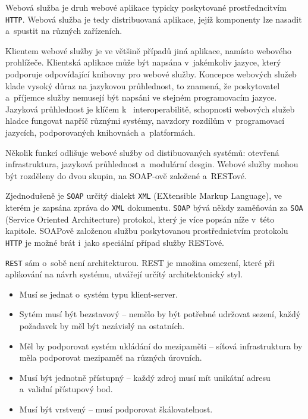 \documentclass[twoside, 12pt]{article}
\begin{document}
{

Webová služba je druh webové aplikace typicky poskytované prostředncitvím \texttt{HTTP}. \cite{kalin}
Webová služba je tedy distribuovaná aplikace, jejíž komponenty lze nasadit a~spustit na různých zařízeních.

Klientem webové služby je ve většině případů jiná aplikace, namísto webového prohlížeče.
Klientská aplikace může být napsána v~jakémkoliv jazyce, který podporuje
odpovídající knihovny pro webové služby.
Koncepce webových služeb klade vysoký důraz na jazykovou průhlednost,
to znamená, že poskytovatel a~příjemce služby nemusejí být napsáni
ve stejném programovacím jazyce.
Jazyková průhlednost je klíčem k~ interoperabilitě,
schopnosti webových služeb hladce fungovat napříč různými systémy,
navzdory rozdílům v~programovací jazycích,
podporovaných knihovnách a~platformách.

Několik funkcí odlišuje webové služby od distibuovaných systémů: otevřená infrastruktura,
jazyková průhlednost a~modulární desgin.
Webové služby mohou být rozděleny do dvou skupin, na SOAP-ově založené a~RESTové.


Zjednodušeně je \texttt{SOAP} určitý dialekt \texttt{XML}
(EXtensible Markup Language), ve kterém je zapsána zpráva do \texttt{XML} dokumentu.
\texttt{SOAP} bývá někdy zaměňován za \texttt{SOA} (Service Oriented Architecture) protokol,
který je více popsán níže v~této kapitole.
SOAPově založenou službu poskytovanou prostřednictvím protokolu \texttt{HTTP}
je možné brát i~jako speciální případ služby RESTové.
\cite{kalin}


\texttt{REST} sám o~sobě není architekturou. REST je množina omezení,
které při aplikování na návrh systému, utvářejí určítý architektonický styl.
\cite{sandoval}

\bigskip

\begin{itemize}
\item Musí se jednat o~systém typu klient-server.
\item Sytém musí být bezstavový -- nemělo by být potřebné udržovat sezení, každý požadavek by měl být nezávislý na ostatních.
\item Měl by podporovat systém ukládání do mezipaměti -- síťová infrastruktura by měla podporovat mezipaměť na různých úrovních.
\item Musí být jednotně přístupný -- každý zdroj musí mít unikátní adresu a~validní přístupový bod.
\item Musí být vrstvený -- musí podporovat škálovatelnost.
\end{itemize}

}
\end{document}
